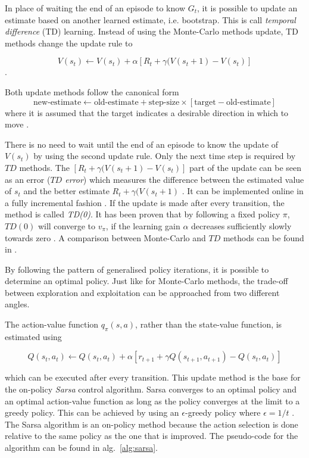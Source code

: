 In place of waiting the end of an episode to know $G_t$, it is possible to update an estimate based on another learned estimate, i.e. bootstrap. This is call \textit{temporal difference} (TD) learning. Instead of using the Monte-Carlo methods update, TD methods change the update rule to 
 
 $$V(s_t) \longleftarrow V(s_t) + \alpha[R_t +\gamma(V(s_t+1) - V(s_t)]$$. 
 
Both update methods follow the canonical form $$\text{new-estimate} \longleftarrow \text{old-estimate} + \text{step-size} \times [ \text{target} - \text{old-estimate}]$$ where it is assumed that the target indicates a desirable direction in which to move \cite[p.~30]{sutton_reinforcement_1998}.
 
There is no need to wait until the end of an episode to know the update of $V(s_t)$ by using the second update rule. Only the next time step is required by $TD$ methods. The $[R_t +\gamma(V(s_t+1) - V(s_t)]$ part of the update can be seen as an error (\textit{$TD$ error}) which measures the difference between the estimated value of $s_t$ and the better estimate $R_t +\gamma(V(s_t+1)$ \cite[p.~121]{sutton_reinforcement_1998}. It can be implemented online in a fully incremental fashion \cite[p.~124]{sutton_reinforcement_1998}. If the update is made after every transition, the method is called \textit{TD(0)}. It has been proven that by following a fixed policy $\pi$, $TD(0)$ will converge to $v_{\pi}$, if the learning gain $\alpha$ decreases sufficiently slowly towards zero \cite{sutton_learning_1988}. A comparison between Monte-Carlo and $TD$ methods can be found in \cite[p.~123]{sutton_reinforcement_1998}.

By following the pattern of generalised policy iterations, it is possible to determine an optimal policy. Just like for Monte-Carlo methods, the trade-off between exploration and exploitation can be approached from two different angles.

The action-value function $q_{\pi}(s, a)$, rather than the state-value function, is estimated using 
 
 $$Q(s_t, a_t) \longleftarrow Q(s_t, a_t) + \alpha[r_{t+1} + \gamma Q(s_{t+1}, a_{t+1}) - Q(s_t, a_t)]$$
 
 which can be executed after every transition. This update method is the base for the on-policy \textit{Sarsa} control algorithm. Sarsa converges to an optimal policy and an optimal action-value function as long as the policy converges at the limit to a greedy policy. This can be achieved by using an $\epsilon$-greedy policy where $\epsilon = 1/t$ \cite[p.~129]{sutton_reinforcement_1998}. The Sarsa algorithm is an on-policy method because the action selection is done relative to the same policy as the one that is improved. The pseudo-code for the algorithm can be found in alg.~\ref{alg:sarsa}. 
 
